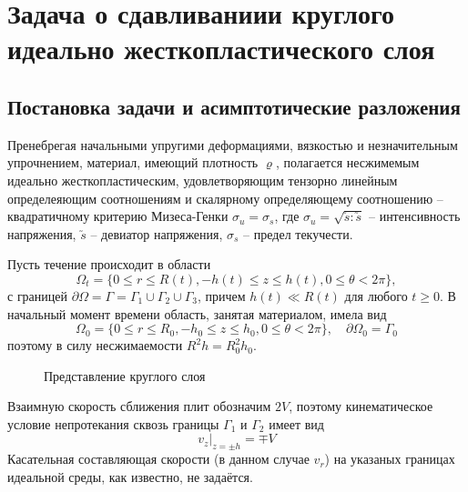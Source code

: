 \chapter{Задача о сдавливаниии круглого идеально жесткопластического слоя}\label{ch:ch1}

\section{Постановка задачи и асимптотические разложения}\label{sec:ch1/sec1}

Пренебрегая начальными упругими деформациями, вязкостью и незначительным упрочнением, материал, имеющий плотность $\varrho$, полагается несжимемым идеально жесткопластическим, удовлетворяющим тензорно линейным определеяющим соотношениям и скалярному определяющему соотношению -- квадратичному критерию Мизеса-Генки $\sigma_{u} = \sigma_{s}$, где $\sigma_{u} = \sqrt{\utilde{s} : \utilde{s}}$ -- интенсивность напряжения, $\utilde{s}$ -- девиатор напряжения, $\sigma_{s}$ -- предел текучести.

Пусть течение происходит в области
\begin{equation}
  \Omega_{t} = \{0 \le r \le R(t), -h(t) \le z \le h(t), 0 \le \theta < 2\pi\},
\end{equation}
с границей $\partial\Omega = \Gamma = \Gamma_{1} \cup \Gamma_{2} \cup \Gamma_{3}$, причем $h(t) \ll R(t)$ для любого $t \ge 0$. В начальный момент времени область, занятая материалом, имела вид
\begin{equation}
  \Omega_{0} = \{0 \le r \le R_{0}, -h_{0} \le z \le h_{0}, 0 \le \theta < 2\pi\}, \quad \partial\Omega_{0} = \Gamma_{0}
\end{equation}
поэтому в силу несжимаемости $R^{2} h=R^{2}_{0} h_{0}$.

\begin{figure}[ht]
    \caption{Представление круглого слоя}
    \label{fig:ch1/layer}
\end{figure}
Взаимную скорость сближения плит обозначим $2V$, поэтому кинематическое условие непротекания сквозь границы $\Gamma_{1}$ и $\Gamma_{2}$ имеет вид
\begin{equation}
  \label{eq:ch1/sec1/boundary/kinematic}
  v_{z}\lvert_{z=\pm h} = \mp V
\end{equation}
Касательная составляющая скорости (в данном случае $v_{r}$) на указаных границах идеальной среды, как известно, не задаётся.

